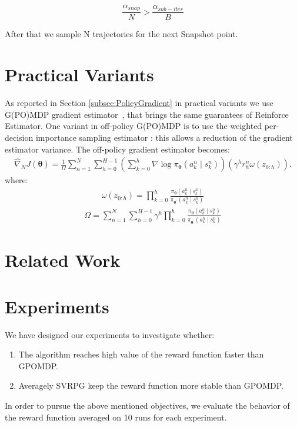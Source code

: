 \documentclass{article}
\theoremstyle{remark}
\theoremstyle{definition}
\newcommand{\vtheta}{\boldsymbol{\theta}}
\newcommand{\score}[2]{\nabla\log\pi_{#1}(#2)}
\newcommand{\gradApp}[2]{\hat{\nabla}_{#2}J(#1)}
\begin{document}
\[\frac{\alpha_{snap}}{N}>\frac{\alpha_{sub-iter}}{B}\]

After that we sample N trajectories for the next Snapshot point.


\section{Practical Variants}

As reported in Section \ref{subsec:PolicyGradient} in practical variants we use G(PO)MDP gradient estimator~\cite{baxter2001infinite}, that brings the same guarantees of Reinforce Estimator.
One variant in off-policy G(PO)MDP is to use the weighted per-decision importance sampling estimator \cite{precup2000eligibility}:  this allows a reduction of the gradient estimator variance. The off-policy gradient estimator becomes:
\begin{align*}
\gradApp{\vtheta}{N} = \frac{1}{\Omega}\sum_{n=1}^{N}\sum_{h=0}^{H-1}\left(\sum_{k=0}^{h}\score{\vtheta}{a_k^n\mid s_k^n}\right)\left(\gamma^h r_h^n \omega(z_{0:h})\right).
\end{align*} 
where:
\begin{align*}
\omega(z_{0:h}) = \prod_{k=0}^{h} \frac{\pi_{\vtheta}({a_k^n\mid s_k^n})
 }{\pi_{\vtheta^{'}}({a_k^n\mid s_k^n})}
\end{align*}
\begin{align*}
\Omega = \sum_{n=1}^{N}\sum_{h=0}^{H-1}\gamma^h\prod_{k=0}^{h} \frac{\pi_{\vtheta}({a_k^n\mid s_k^n})
}{\pi_{\vtheta^{'}}({a_k^n\mid s_k^n})}
\end{align*}

\section{Related Work}

\section{Experiments}
We have designed our experiments to investigate whether:
\begin{enumerate}
\item The algorithm reaches high value of the reward function faster than GPOMDP.
\item Averagely SVRPG keep the reward function more stable than GPOMDP.
\end{enumerate}

In order to pursue the above mentioned objectives, we evaluate the behavior of the reward function averaged on 10 runs for each experiment.
\end{document}
